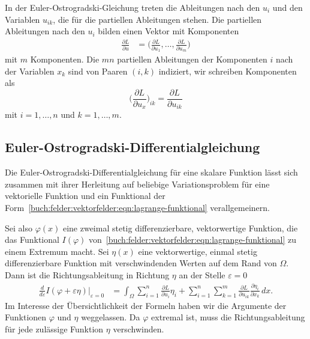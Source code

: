 In der Euler-Ostrogradski-Gleichung treten die Ableitungen nach
den $u_i$ und den Variablen $u_{ik}$, die für die partiellen
Ableitungen stehen.
Die partiellen Ableitungen nach den $u_i$ bilden einen Vektor
mit Komponenten
\begin{align*}
\frac{\partial L}{\partial u}
&=
\biggl(
\frac{\partial L}{\partial u_1}
,\dots,
\frac{\partial L}{\partial u_m}
\biggr)
\end{align*}
mit $m$ Komponenten.
Die $mn$ partiellen Ableitungen der Komponenten $i$ nach der Variablen $x_k$
sind von Paaren $(i,k)$ indiziert, wir schreiben Komponenten als
\[
\biggl(
\frac{\partial L}{\partial u_x}
\biggr)_{ik}
=
\frac{\partial L}{\partial u_{ik}}
\]
mit $i=1,\dots,n$ und $k=1,\dots,m$.

%
%
\subsection{Euler-Ostrogradski-Differentialgleichung
\label{buch:felder:vektorfelder:subsection:euler-ostrogradski-dgl}}
Die Euler-Ostrogradski-Differentialgleichung für eine skalare
Funktion lässt sich zusammen mit ihrer Herleitung auf beliebige 
Variationsproblem für eine vektorielle Funktion und ein Funktional
der Form~\eqref{buch:felder:vektorfelder:eqn:lagrange-funktional}
verallgemeinern.

Sei also $\varphi(x)$ eine zweimal stetig differenzierbare, vektorwertige
Funktion, die das Funktional $I(\varphi)$
von~\eqref{buch:felder:vektorfelder:eqn:lagrange-funktional}
zu einem Extremum macht.
Sei $\eta(x)$ eine vektorwertige, einmal stetig differenzierbare
Funktion mit verschwindenden Werten auf dem Rand von $\Omega$.
Dann ist die Richtungsableitung in Richtung $\eta$ an der Stelle
$\varepsilon=0$
\begin{align}
\frac{d}{d\varepsilon}
I(\varphi+\varepsilon\eta)
\bigg|_{\varepsilon=0}
&=
\int_{\Omega}
\sum_{i=1}^n
\frac{\partial L}{\partial u_i}
\eta_i
+
\sum_{i=1}^n
\sum_{k=1}^m
\frac{\partial L}{\partial u_{ik}} \frac{\partial \eta_i}{\partial x_k}
\,dx.
\label{buch:felder:vektorfelder:eqn:richtungsableitung}
\end{align}
Im Interesse der Übersichtlichkeit der Formeln haben wir die Argumente
der Funktionen $\varphi$ und $\eta$ weggelassen.
Da $\varphi$ extremal ist, muss die Richtungsableitung für jede 
zulässige Funktion $\eta$ verschwinden.

